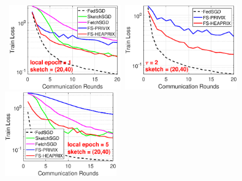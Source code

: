 \documentclass[11pt]{article}
\begin{document}
\begin{figure}[h]
	\begin{center}
		\mbox{%
		 \includegraphics[width=1.9in]{MNIST_figures/local1_sketch20_iid1_train_loss.eps} 
		\includegraphics[width=1.9in]{MNIST_figures/local2_sketch20_iid1_train_loss.eps} 
		\includegraphics[width=1.9in]{MNIST_figures/local5_sketch20_iid1_train_loss.eps}}
		

\end{center}
\end{figure}
\end{document}
